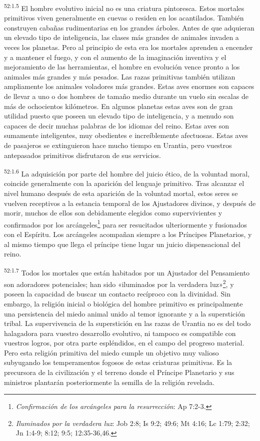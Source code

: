 \par
\textsuperscript{52:1.5} El hombre evolutivo inicial no es una criatura pintoresca. Estos mortales primitivos viven generalmente en cuevas o residen en los acantilados. También construyen cabañas rudimentarias en los grandes árboles. Antes de que adquieran un elevado tipo de inteligencia, las clases más grandes de animales invaden a veces los planetas. Pero al principio de esta era los mortales aprenden a encender y a mantener el fuego, y con el aumento de la imaginación inventiva y el mejoramiento de las herramientas, el hombre en evolución vence pronto a los animales más grandes y más pesados. Las razas primitivas también utilizan ampliamente los animales voladores más grandes. Estas aves enormes son capaces de llevar a uno o dos hombres de tamaño medio durante un vuelo sin escalas de más de ochocientos kilómetros. En algunos planetas estas aves son de gran utilidad puesto que poseen un elevado tipo de inteligencia, y a menudo son capaces de decir muchas palabras de los idiomas del reino. Estas aves son sumamente inteligentes, muy obedientes e increíblemente afectuosas. Estas aves de pasajeros se extinguieron hace mucho tiempo en Urantia, pero vuestros antepasados primitivos disfrutaron de sus servicios.

\par
\textsuperscript{52:1.6} La adquisición por parte del hombre del juicio ético, de la voluntad moral, coincide generalmente con la aparición del lenguaje primitivo. Tras alcanzar el nivel humano después de esta aparición de la voluntad mortal, estos seres se vuelven receptivos a la estancia temporal de los Ajustadores divinos, y después de morir, muchos de ellos son debidamente elegidos como supervivientes y confirmados por los arcángeles\footnote{\textit{Confirmación de los arcángeles para la resurrección}: Ap 7:2-3.} para ser resucitados ulteriormente y fusionados con el Espíritu. Los arcángeles acompañan siempre a los Príncipes Planetarios, y al mismo tiempo que llega el príncipe tiene lugar un juicio dispensacional del reino.

\par
\textsuperscript{52:1.7} Todos los mortales que están habitados por un Ajustador del Pensamiento son adoradores potenciales; han sido «iluminados por la verdadera luz»\footnote{\textit{Iluminados por la verdadera luz}: Job 2:8; Is 9:2; 49:6; Mt 4:16; Lc 1:79; 2:32; Jn 1:4-9; 8:12; 9:5; 12:35-36,46.}, y poseen la capacidad de buscar un contacto recíproco con la divinidad. Sin embargo, la religión inicial o biológica del hombre primitivo es principalmente una persistencia del miedo animal unido al temor ignorante y a la superstición tribal. La supervivencia de la superstición en las razas de Urantia no es del todo halagadora para vuestro desarrollo evolutivo, ni tampoco es compatible con vuestros logros, por otra parte espléndidos, en el campo del progreso material. Pero esta religión primitiva del miedo cumple un objetivo muy valioso subyugando los temperamentos fogosos de estas criaturas primitivas. Es la precursora de la civilización y el terreno donde el Príncipe Planetario y sus ministros plantarán posteriormente la semilla de la religión revelada.

